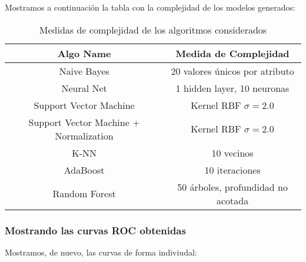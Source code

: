 \documentclass[11pt]{article}
\begin{document}
Mostramos a continuación la tabla con la complejidad de los modelos generados:

\begin{table}[H]
\begin{center}
    \begin{tabular}{|c|c|}
        \hline
        Algo Name & Medida de Complejidad \\
        \hline
        Naive Bayes& 20 valores únicos por atributo \\
        Neural Net & 1 hidden layer, 10 neuronas \\
        Support Vector Machine& Kernel RBF $\sigma = 2.0$ \\
        Support Vector Machine + Normalization& Kernel RBF $\sigma = 2.0$ \\
        K-NN& 10 vecinos \\
        AdaBoost& 10 iteraciones \\
        Random Forest& 50 árboles, profundidad no acotada \\
        \hline
    \end{tabular}
\end{center}
    \caption{Medidas de complejidad de los algoritmos considerados}
\end{table}

\pagebreak

\subsubsection{Mostrando las curvas ROC obtenidas}

Mostramos, de nuevo, las curvas de forma indiviudal:
\end{document}
